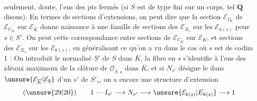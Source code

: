  seulement,  doute, l'ens des pts fermés (si $S$ est de type fini sur un corps, tel $\mathbf Q$ disons). En termes de sections d'extensions, on peut dire que la section $\mathcal E_{f_K}$ de $\mathcal E_{U_K}$ sur $\mathcal E_K$ donne naissance à une famille de sections des $\mathcal E_{X_s}$ sur les $\mathcal E_{k(s)}$ pour $s\in S'$. On peut    cette correspondance entre sections de $\mathcal E_{U_K}$ sur $\mathcal E_K$, et sections des $\mathcal E_{X_s}$ sur les $\mathcal E_{k(s)}$, en généralisant ce qu'on a vu dans le cas où $s$ est de codim $1$ : On introduit le normalisé $S'$ de $S$ dans $\overline K$, la fibre en $s$ s'identifie à l'ens des idéaux maximaux de la clôture  de $\underline{\mathcal O}_{S,s}$ dans $\overline K$, et si $N_{s'}$ désigne le   dans $\unsure{\mathcal E_{\overline K}|\mathcal E_{\overline\eta}}$ d'un $s'$ de $S'_s$, on a encore une structure d'extension
\[
(\unsure{29|20})\qquad
1\mathrel{\text{---}}I_{s'}\longrightarrow N_{s'}\longrightarrow \unsure{\mathcal E_{k(s)}|E_{k(s)}}\longrightarrow 1
\]
